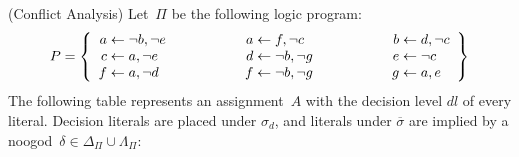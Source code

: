 \begin{Uebung}{(Conflict Analysis)}
Let~$\Pi$ be the following logic program:
\[
\Pi =
\left\{
\begin{array}{r@{}c@{}l@{\hspace{20mm}}r@{}c@{}l@{\hspace{20mm}}r@{}c@{}l}
a & {} \leftarrow {} & \naf b, \naf e &
a & {} \leftarrow {} & f, \naf c &
b & {} \leftarrow {} & d, \naf c
\\
c & {} \leftarrow {} & a, \naf e &
d & {} \leftarrow {} & \naf b, \naf g &
e & {} \leftarrow {} & \naf c
\\
f & {} \leftarrow {} & a, \naf d &
f & {} \leftarrow {} & \naf b, \naf g &
g & {} \leftarrow {} & a, e
\end{array}
\right\}
\]
The following table represents an assignment~$A$ with the decision level $\mathit{dl}$ of every literal.
Decision literals are placed under $\sigma_d$,
and literals under $\overline{\sigma}$ are implied by a noogod~$\delta\in\Delta_\Pi\cup\Lambda_\Pi$:


\end{Uebung}
